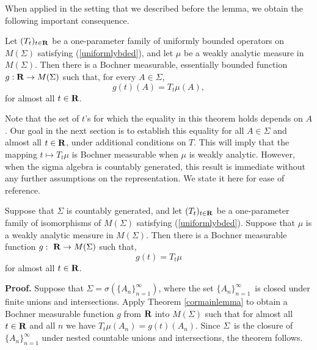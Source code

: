 When applied in the setting that we described
before the lemma, we obtain the following important consequence.
\begin{cormainlemma}
Let $(T_t)_{t\in\R}$ be a one-parameter family of 
uniformly bounded operators on $M(\Sigma)$ satisfying
(\ref{uniformlybded}), and 
let $\mu$ be a weakly analytic measure in $M(\Sigma)$.  
Then there is a Bochner measurable, essentially bounded function 
$g:\R\rightarrow M(\Sigma)$ such that, for every $A\in \Sigma$, 
$$g(t)(A)=T_t\mu(A),$$
for almost all $t\in \R$.
\label{cormainlemma}
\end{cormainlemma}
Note that the set of $t$'s 
for which the equality in this theorem holds depends on $A$.   
Our goal in the next section is to establish this equality
for all $A\in \Sigma$ and almost all $t\in \R$,
under additional conditions on $T$.
This will imply that the mapping $t\mapsto T_t\mu$
is Bochner measurable 
when $\mu$ is weakly analytic.  
However, when the sigma algebra
is countably generated, this result 
is immediate without any further assumptions on the 
representation. We state it here for ease of reference.
\begin{riesz1}
Suppose that $\Sigma$ is countably generated, and let 
$(T_t)_{t\in\R}$ be a one-parameter family of 
isomorphisms of $M(\Sigma)$ satisfying
(\ref{uniformlybded}).  Suppose that 
$\mu$ is a weakly analytic measure in $M(\Sigma)$.  
Then there is a Bochner measurable function 
$g:\ \R\rightarrow M(\Sigma)$ such that, 
$$g(t)=T_t\mu$$
for almost all $t\in\R$.
\label{riesz1}
\end{riesz1}
{\bf Proof.}  Suppose that $\Sigma=\sigma(\{A_n\}_{n=1}^\infty)$, where
the set $\{A_n\}_{n=1}^\infty$\ is closed under finite unions and
intersections.
Apply Theorem \ref{cormainlemma} to obtain a Bochner 
measurable function $g$ from $\R$ into $M(\Sigma)$ such that
for almost all $t\in \R$ and all $n$ we have
$T_t\mu(A_n)=g(t)(A_n)$.  Since $\Sigma$\ is the closure of 
$\{A_n\}_{n=1}^\infty$ 
under nested countable unions and intersections,
the theorem follows.


